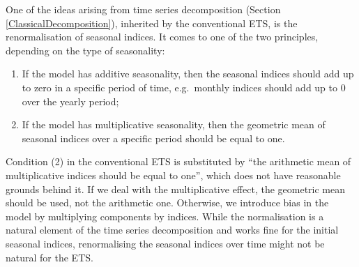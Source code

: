 \documentclass[]{book}
\providecommand{\tightlist}{%
  \setlength{\itemsep}{0pt}\setlength{\parskip}{0pt}}
\theoremstyle{definition}
\theoremstyle{definition}
\theoremstyle{definition}
\theoremstyle{definition}
\theoremstyle{remark}
\begin{document}
One of the ideas arising from time series decomposition (Section \ref{ClassicalDecomposition}), inherited by the conventional ETS, is the renormalisation of seasonal indices. It comes to one of the two principles, depending on the type of seasonality:

\begin{enumerate}
\def\labelenumi{\arabic{enumi}.}
\tightlist
\item
  If the model has additive seasonality, then the seasonal indices should add up to zero in a specific period of time, e.g.~monthly indices should add up to 0 over the yearly period;
\item
  If the model has multiplicative seasonality, then the geometric mean of seasonal indices over a specific period should be equal to one.
\end{enumerate}

Condition (2) in the conventional ETS is substituted by ``the arithmetic mean of multiplicative indices should be equal to one'', which does not have reasonable grounds behind it. If we deal with the multiplicative effect, the geometric mean should be used, not the arithmetic one. Otherwise, we introduce bias in the model by multiplying components by indices. While the normalisation is a natural element of the time series decomposition and works fine for the initial seasonal indices, renormalising the seasonal indices over time might not be natural for the ETS.
\end{document}
